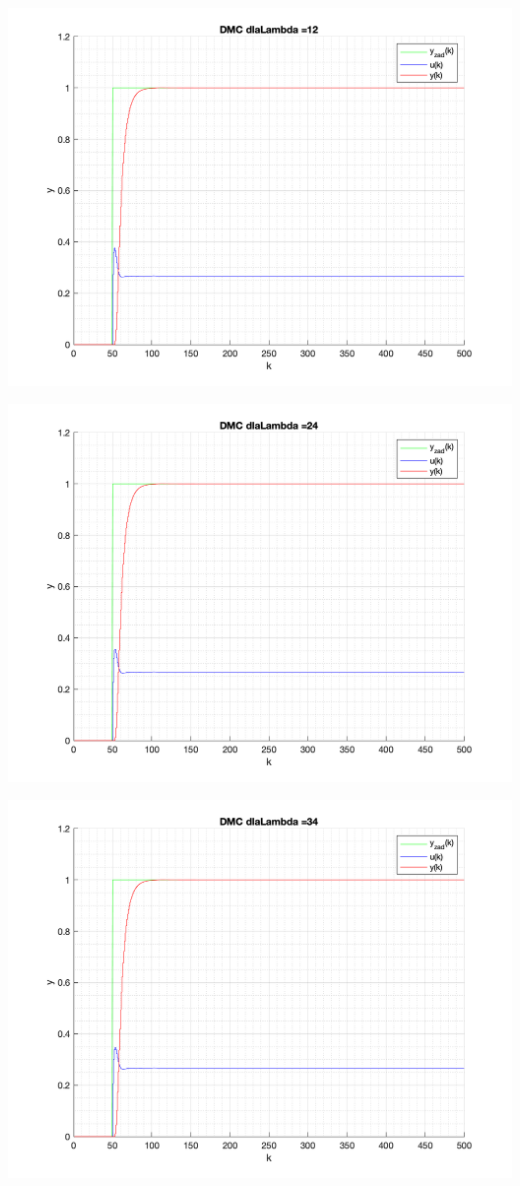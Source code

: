 \documentclass[a4paper, 11pt]{article}
\begin{document}
\begin{enumerate}
 \includegraphics[width=\linewidth]{./ModelsP4_Lambda/P4_DMC_Lambda_12_png.png} 
 
 \includegraphics[width=\linewidth]{./ModelsP4_Lambda/P4_DMC_Lambda_24_png.png} 
 
 \includegraphics[width=\linewidth]{./ModelsP4_Lambda/P4_DMC_Lambda_34_png.png} 
 

\end{enumerate}
\end{document}
